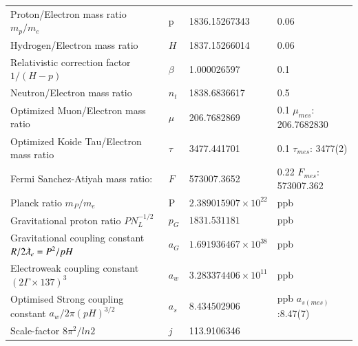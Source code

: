 \documentclass[a4paper,9pt]{article}
\newcounter{row}
\begin{document}
\begin{table}
\begin{tabular}{llll}
    Proton/Electron mass ratio $m_p/m_e$ & p   & 1836.15267343  & 0.06 \\  
    Hydrogen/Electron mass ratio  & $H$  & 1837.15266014  & 0.06 \\
    Relativistic correction factor $1/(H-p)$ & $\beta$  & 1.000026597  & 0.1 \\
    Neutron/Electron mass ratio  & $n_t$ & 1838.6836617  & 0.5 \\     
    Optimized Muon/Electron mass ratio  & $\mu$ & 206.7682869  & 0.1 $\mu_{mes}$: 206.7682830 \\     
    Optimized Koide Tau/Electron mass ratio  & $\tau$ & 3477.441701  & 0.1 $\tau_{mes}$: 3477(2) \\  
 Fermi Sanchez-Atiyah mass ratio: & $F$   & 573007.3652  & 0.22 $F_{mes}$: 573007.362 \\
 Planck ratio $m_P/m_e$ & P   & $2.389015907 \times 10^{22}$ &ppb  \cite{Sanchez2}  \\
 Gravitational proton ratio $P N_L^{-1/2}$ & $p_G$    & $ 1831.531181 $ &ppb  \cite{Sanchez2}  \\
 Gravitational coupling constant $R/2\lambdabar_e = P^2/pH$ & $a_G$   & $1.691936467 \times 10^{38}$ &ppb  \cite{Sanchez2}  \\
 Electroweak coupling constant $(2\Gamma\times 137)^3$ & $a_w$     & $3.283374406 \times 10^{11}$ & ppb \cite{Sanchez2}  \\
Optimised Strong coupling constant $a_w/2\pi(pH)^{3/2}$ & $a_s$   & $8.434502906$ & ppb \cite{Sanchez2} $a_{s(mes)}$:8.47(7) \\
 Scale-factor $8\pi^2/ln2$  & $j$ & 113.9106346  & \cite{Sanchez2} \\
 
   
    
         
   \bottomrule
  \end{tabular}
\end{table}
 
\end{document}
